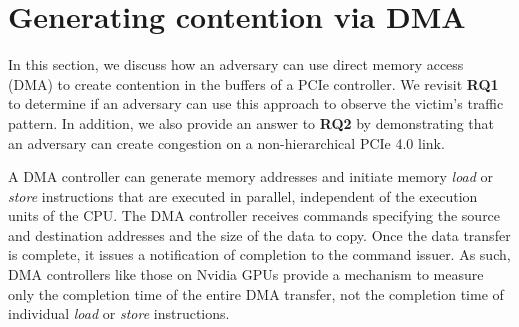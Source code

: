 \section{Generating contention via DMA}
\label{sec:interconnect-sc-dma}

In this section, we discuss how an adversary can use direct memory access (DMA) to create contention in the buffers of a PCIe controller.
We revisit \textbf{RQ1} to determine if an adversary can use this approach to observe the victim's traffic pattern. 
In addition, we also provide an answer to \textbf{RQ2} by demonstrating that an adversary can create congestion on a non-hierarchical PCIe 4.0 link.

A DMA controller can generate memory addresses and initiate memory \textit{load} or \textit{store} instructions that are executed in parallel, independent of the execution units of the CPU.
The DMA controller receives commands specifying the source and destination addresses and the size of the data to copy.
Once the data transfer is complete, it issues a notification of completion to the command issuer.
As such, DMA controllers like those on Nvidia GPUs provide a mechanism to measure only the completion time of the entire DMA transfer, not the completion time of individual \textit{load} or \textit{store} instructions.


